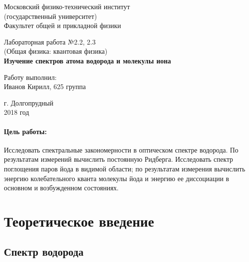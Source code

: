 \documentclass[12pt]{kiarticle}
\begin{document}
	
	\begin{titlepage}
		\begin{center}
			\large 	Московский физико-технический институт \\
			(государственный университет) \\
			Факультет общей и прикладной физики \\
			\vspace{0.2cm}
			
			\vspace{4.5cm}
			Лабораторная работа №2.2, 2.3  \\ \vspace{0.2cm}
			\large (Общая физика: квантовая физика) \\ \vspace{0.2cm}
			\LARGE \textbf{ Изучение спектров атома водорода и молекулы иона }
		\end{center}
		\vspace{2.3cm} \large
		
		\begin{center}
			Работу выполнил: \\
			Иванов Кирилл,
			625 группа
			\vspace{10mm}		
			
		\end{center}
		
		\begin{center} \vspace{60mm}
			г. Долгопрудный \\
			2018 год
		\end{center}
	\end{titlepage}


	\paragraph*{Цель работы:}  
	
	Исследовать спектральные закономерности в оптическом спектре водорода. По результатам измерений вычислить постоянную Ридберга. Исследовать спектр поглощения паров йода в видимой области; по результатам измерения вычислить энергию колебательного кванта молекулы йода и энергию ее диссоциации в основном и возбужденном состояниях.
	
	
	\section{Теоретическое введение}
	
	\subsection{Спектр водорода}
	
\end{document}
